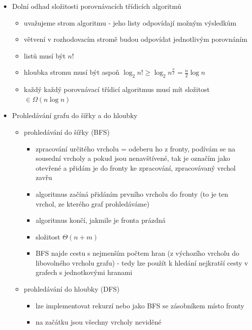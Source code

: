 \begin{itemize}
\begin{itemize}
\begin{itemize}
\item střední hodnota počtu pokusů, než zvolíme skoromedián, je podle lemmatu o džbánu rovna $2$ (to se schová do konstanty)
\item když jsme zvolili skoromedián, tak se problém zmenšil na $\frac34$
\end{itemize}
\item složitost v nejhorším případě je $\Theta(n^2)$
\end{itemize}
\item Dolní odhad složitosti porovnávacích třídicích algoritmů
\begin{itemize}
\item uvažujeme strom algoritmu - jeho listy odpovídají možným výsledkům
\item větvení v rozhodovacím stromě budou odpovídat jednotlivým porovnáním
\item listů musí být $n!$
\item hloubka stromu musí být aspoň $\log_2n!\geq \log_2 n^{\frac n2}=\frac n2 \log n$
\item každý každý porovnávací třídicí algoritmus musí mít složitost $\in\Omega(n\log n)$
\end{itemize}
\item Prohledávání grafu do šířky a do hloubky
\begin{itemize}
\item prohledávání do šířky (BFS)
\begin{itemize}
\item zpracování určitého vrcholu = odeberu ho z fronty, podívám se na sousední vrcholy a pokud jsou nenavštívené, tak je označím jako otevřené a přidám je do fronty ke zpracování, zpracovávaný vrchol zavřu
\item algoritmus začíná přidáním prvního vrcholu do fronty (to je ten vrchol, ze kterého graf prohledáváme)
\item algoritmus končí, jakmile je fronta prázdná
\item složitost $\Theta(n+m)$
\item BFS najde cestu s nejmenším počtem hran (z výchozího vrcholu do libovolného vrcholu grafu) - tedy lze použít k hledání nejkratší cesty v grafech s jednotkovými hranami 
\end{itemize}
\item prohledávání do hloubky (DFS)
\begin{itemize}
\item lze implementovat rekurzí nebo jako BFS se zásobníkem místo fronty
\item na začátku jsou všechny vrcholy neviděné

\end{itemize}
\end{itemize}
\end{itemize}
